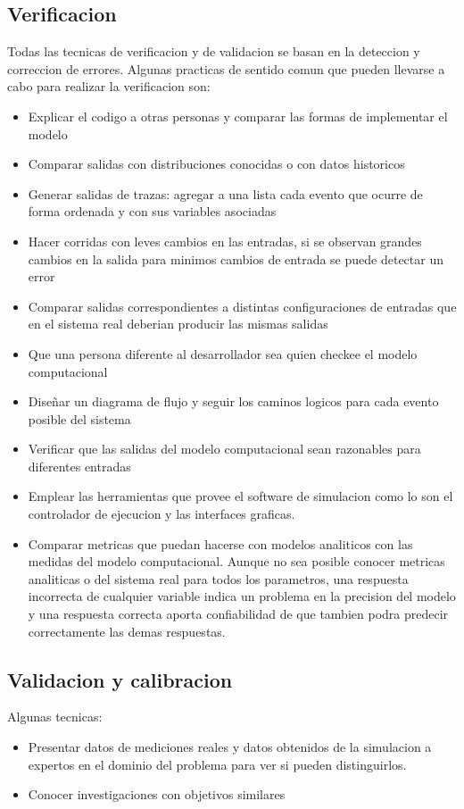 \documentclass[a4paper]{article}
\begin{document}
\subsection*{Verificacion}
Todas las tecnicas de verificacion y de validacion se basan en la deteccion y correccion de errores.
Algunas practicas de sentido comun que pueden llevarse a cabo para realizar la verificacion son:
\begin{itemize}
    \item Explicar el codigo a otras personas y comparar las formas de implementar el modelo
    \item Comparar salidas con distribuciones conocidas o con datos historicos
    \item Generar salidas de trazas: agregar a una lista cada evento que ocurre de forma ordenada 
    y con sus variables asociadas
    \item Hacer corridas con leves cambios en las entradas, si se observan grandes cambios en la 
    salida para minimos cambios de entrada se puede detectar un error
    \item Comparar salidas correspondientes a distintas configuraciones de entradas que en el sistema 
    real deberian producir las mismas salidas
    \item Que una persona diferente al desarrollador sea quien checkee el modelo computacional
    \item Diseñar un diagrama de flujo y seguir los caminos logicos para cada evento posible del sistema
    \item Verificar que las salidas del modelo computacional sean razonables para diferentes entradas
    \item Emplear las herramientas que provee el software de simulacion como lo son el controlador de 
    ejecucion y las interfaces graficas.
    \item Comparar metricas que puedan hacerse con modelos analiticos con las medidas del modelo computacional. 
    Aunque no sea posible conocer metricas analiticas o del sistema real para todos los parametros, una 
    respuesta incorrecta de cualquier variable indica un problema en la precision del modelo y una respuesta 
    correcta aporta confiabilidad de que tambien podra predecir correctamente las demas respuestas.
\end{itemize}

\subsection*{Validacion y calibracion}
Algunas tecnicas:
\begin{itemize}
    \item Presentar datos de mediciones reales y datos obtenidos de la simulacion a expertos en el dominio del problema
    para ver si pueden distinguirlos.
    \item Conocer investigaciones con objetivos similares
\end{itemize}
\end{document}
